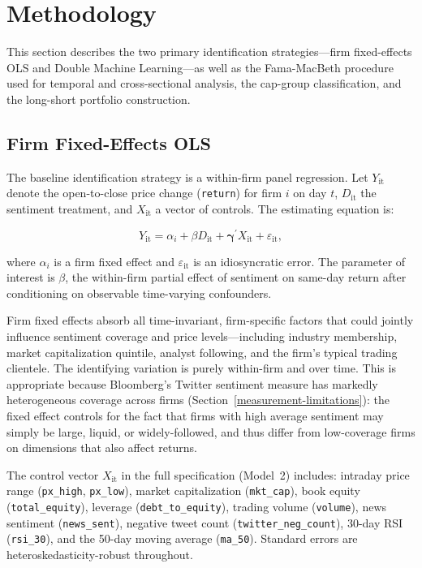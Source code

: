 \section{Methodology}\label{methodology}

This section describes the two primary identification strategies---firm
fixed-effects OLS and Double Machine Learning---as well as the
Fama-MacBeth procedure used for temporal and cross-sectional analysis,
the cap-group classification, and the long-short portfolio construction.

\subsection{Firm Fixed-Effects OLS}\label{firm-fixed-effects-ols}

The baseline identification strategy is a within-firm panel regression.
Let \(Y_{\text{it}}\) denote the open-to-close price change
(\texttt{return}) for firm \(i\) on day \(t\), \(D_{\text{it}}\) the
sentiment treatment, and \(X_{\text{it}}\) a vector of controls. The
estimating equation is:

\[Y_{\text{it}} = \alpha_{i} + \beta D_{\text{it}} + \mathbf{\gamma}^{'}X_{\text{it}} + \varepsilon_{\text{it}},\]

where \(\alpha_{i}\) is a firm fixed effect and
\(\varepsilon_{\text{it}}\) is an idiosyncratic error. The parameter of
interest is \(\beta\), the within-firm partial effect of sentiment on
same-day return after conditioning on observable time-varying
confounders.

Firm fixed effects absorb all time-invariant, firm-specific factors that
could jointly influence sentiment coverage and price levels---including
industry membership, market capitalization quintile, analyst following,
and the firm's typical trading clientele. The identifying variation is
purely within-firm and over time. This is appropriate because
Bloomberg's Twitter sentiment measure has markedly heterogeneous
coverage across firms
(Section~\ref{measurement-limitations}): the fixed
effect controls for the fact that firms with high average sentiment may
simply be large, liquid, or widely-followed, and thus differ from
low-coverage firms on dimensions that also affect returns.

The control vector \(X_{\text{it}}\) in the full specification (Model~2)
includes: intraday price range (\texttt{px\_high}, \texttt{px\_low}),
market capitalization (\texttt{mkt\_cap}), book equity
(\texttt{total\_equity}), leverage (\texttt{debt\_to\_equity}), trading
volume (\texttt{volume}), news sentiment (\texttt{news\_sent}), negative
tweet count (\texttt{twitter\_neg\_count}), 30-day RSI (\texttt{rsi\_30}),
and the 50-day moving average (\texttt{ma\_50}).
Standard errors are heteroskedasticity-robust throughout.

